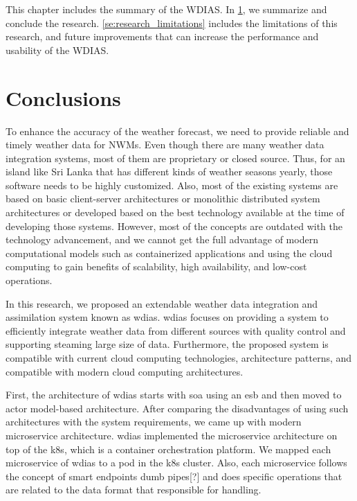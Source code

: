 This chapter includes the summary of the WDIAS. In \cref{se:summary_conclusion}, we summarize and conclude the research. \cref{se:research_limitations} includes the limitations of this research, and future improvements that can increase the performance and usability of the WDIAS.

\section{Conclusions}
\label{se:summary_conclusion}

To enhance the accuracy of the weather forecast, we need to provide reliable and timely weather data for NWMs. Even though there are many weather data integration systems, most of them are proprietary or closed source. Thus, for an island like Sri Lanka that has different kinds of weather seasons yearly, those software needs to be highly customized. Also, most of the existing systems are based on basic client-server architectures or monolithic distributed system architectures or developed based on the best technology available at the time of developing those systems. However, most of the concepts are outdated with the technology advancement, and we cannot get the full advantage of modern computational models such as containerized applications and using the cloud computing to gain benefits of scalability, high availability, and low-cost operations.

In this research, we proposed an extendable weather data integration and assimilation system known as \acrfull{wdias}. \acrshort{wdias} focuses on providing a system to efficiently integrate weather data from different sources with quality control and supporting steaming large size of data. Furthermore, the proposed system is compatible with current cloud computing technologies, architecture patterns, and compatible with modern cloud computing architectures.

First, the architecture of \acrshort{wdias} starts with \acrshort{soa} using an \acrfull{esb} and then moved to actor model-based architecture. After comparing the disadvantages of using such architectures with the system requirements, we came up with modern microservice architecture. \acrshort{wdias} implemented the microservice architecture on top of the \acrshort{k8s}, which is a container orchestration platform. We mapped each microservice of \acrshort{wdias} to a pod in the \acrshort{k8s} cluster. Also, each microservice follows the concept of smart endpoints dumb pipes[?] and does specific operations that are related to the data format that responsible for handling.


